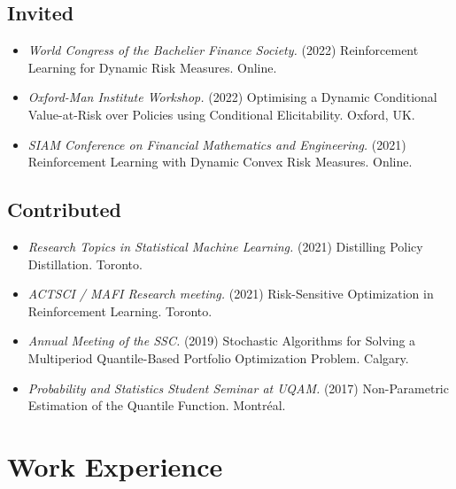 \documentclass[11pt, sans]{moderncv}
\begin{document}
\subsection{Invited }

\begin{itemize}
	\item \normalfont\textit{World Congress of the Bachelier Finance Society.} (2022) Reinforcement Learning for Dynamic Risk Measures. Online.
	\item \normalfont\textit{Oxford-Man Institute Workshop.} (2022) Optimising a Dynamic Conditional Value-at-Risk over Policies using Conditional Elicitability. Oxford, UK.
	\item \normalfont\textit{SIAM Conference on Financial Mathematics and Engineering.} (2021) Reinforcement Learning with Dynamic Convex Risk Measures. Online.
\end{itemize}


\vspace{5pt}
\subsection{Contributed }

\begin{itemize}
	\item \normalfont\textit{Research Topics in Statistical Machine Learning.} (2021) Distilling Policy Distillation. Toronto.
	\item \normalfont\textit{ACTSCI / MAFI Research meeting.} (2021) Risk-Sensitive Optimization in Reinforcement Learning. Toronto.
    \item \normalfont\textit{Annual Meeting of the SSC.} (2019) Stochastic Algorithms for Solving a Multiperiod Quantile-Based Portfolio Optimization Problem. Calgary.
    \item \normalfont\textit{Probability and Statistics Student Seminar at UQAM.} (2017) Non-Parametric Estimation of the Quantile Function. Montréal.
\end{itemize}


\section{Work Experience  }
\end{document}
